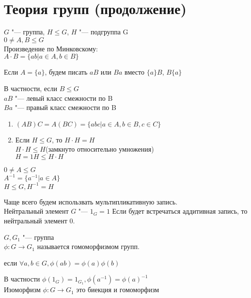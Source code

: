 ﻿\chapter{Теория групп (продолжение)}
\begin{Rem}
$G$ "--- группа, $H \le G$, $H$ "--- подгруппа G\\

$0 \ne A, B \le G$\\
Произведение по Минковскому:\\
$A \cdot B = \{ab| a \in A, b \in B\}$

Если $A = \{a\}$, будем писать $aB$ или $Ba$ вместо $\{a\}B$, $B\{a\}$

В частности, если $B \le G$\\
    $aB$ "--- левый класс смежности по B\\
    $Ba$ "--- правый класс смежности по B\\
\end{Rem}

\begin{conseq}\hfill
\begin{enumerate}
\item$(AB)C = A(BC) = \{abc|a \in A, b \in B, c \in C\}$\\
\item
Если $H \le G$, то $H \cdot H = H$\\
   $H \cdot H \le H$(замкнуто относительно умножения)\\
   $H = 1 H \le H \cdot H$\\
\end{enumerate}
\end{conseq}
\begin{Def}
$0 \ne A \le G$\\
$A^{-1} = \{a^{-1}|a \in A\}$\\
$H \le G, H^{-1} = H$\\
\end{Def}
\begin{Rem}
Чаще всего будем использвать мультипликативную запись.\\
Нейтральный элемент $G$ "--- $1_{G} = 1$
Если будет  встречаться аддитивная запись, то нейтральный элемент $0$.
\end{Rem}

\begin{Def}
$G, G_1$ "--- группа\\
$\phi \colon G \to G_1$ называется гомоморфизмом групп. 

если $\forall a, b \in G, \phi(ab) = \phi(a) \phi(b)$

В частности $\phi(1_G) = 1_{G_1}, \phi(a^{-1}) = \phi(a)^{-1}$\\

Изоморфизм $\phi \colon G \to G_1$ это биекция и гомоморфизм \\
\end{Def}
    

